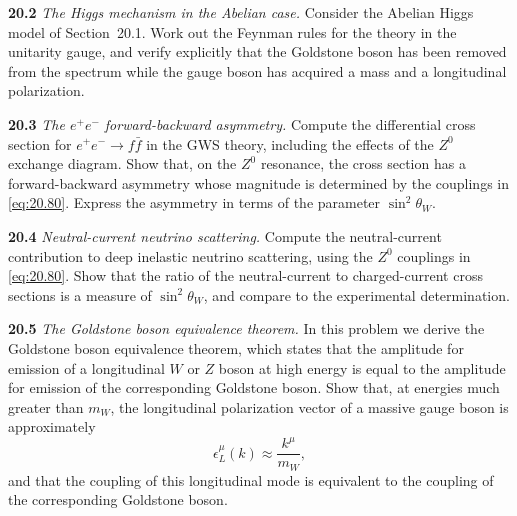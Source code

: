 \textbf{20.2} \emph{The Higgs mechanism in the Abelian case.}  Consider the
Abelian Higgs model of Section~20.1.  Work out the Feynman rules for the
theory in the unitarity gauge, and verify explicitly that the Goldstone boson
has been removed from the spectrum while the gauge boson has acquired a mass
and a longitudinal polarization.

\textbf{20.3} \emph{The $e^{+}e^{-}$ forward-backward asymmetry.}  Compute the
differential cross section for $e^{+}e^{-}\to f\bar{f}$ in the GWS theory,
including the effects of the $Z^0$ exchange diagram.  Show that, on the $Z^0$
resonance, the cross section has a forward-backward asymmetry whose
magnitude is determined by the couplings in \eqref{eq:20.80}.  Express the
asymmetry in terms of the parameter $\sin^2\theta_W$.

\textbf{20.4} \emph{Neutral-current neutrino scattering.}  Compute the
neutral-current contribution to deep inelastic neutrino scattering, using the
$Z^0$ couplings in \eqref{eq:20.80}.  Show that the ratio of the
neutral-current to charged-current cross sections is a measure of
$\sin^2\theta_W$, and compare to the experimental determination.

\textbf{20.5} \emph{The Goldstone boson equivalence theorem.}  In this
problem we derive the Goldstone boson equivalence theorem, which states that
the amplitude for emission of a longitudinal $W$ or $Z$ boson at high energy
is equal to the amplitude for emission of the corresponding Goldstone boson.
Show that, at energies much greater than $m_W$, the longitudinal
polarization vector of a massive gauge boson is approximately
\begin{equation}
  \epsilon^\mu_L(k) \approx \frac{k^\mu}{m_W} ,
\end{equation}
and that the coupling of this longitudinal mode is equivalent to the coupling
of the corresponding Goldstone boson.
